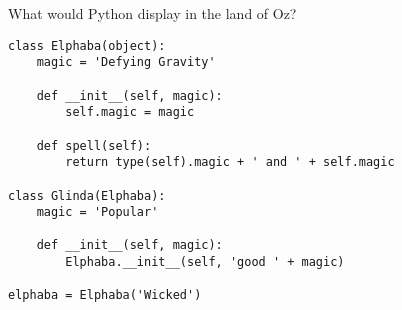 \begin{blocksection}
\question What would Python display in the land of Oz?

\begin{lstlisting}
class Elphaba(object):
    magic = 'Defying Gravity'

    def __init__(self, magic):
        self.magic = magic

    def spell(self):
        return type(self).magic + ' and ' + self.magic

class Glinda(Elphaba):
    magic = 'Popular'

    def __init__(self, magic):
        Elphaba.__init__(self, 'good ' + magic)

elphaba = Elphaba('Wicked')
\end{lstlisting}   

\end{blocksection}
